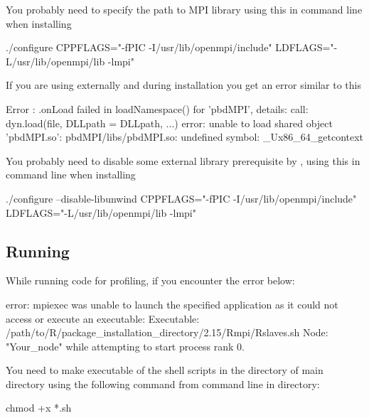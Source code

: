 \begin{solution}
You probably need to specify the path to MPI library
using this in command line when installing 
\begin{Output}
./configure CPPFLAGS="-fPIC -I/usr/lib/openmpi/include" LDFLAGS="-L/usr/lib/openmpi/lib -lmpi"
\end{Output}  
\end{solution}


\begin{problem}
If you are using  externally
and during 
installation you get an error similar to this
\begin{Output}
Error : .onLoad failed in loadNamespace() for 'pbdMPI', details:
  call: dyn.load(file, DLLpath = DLLpath, ...)
  error: unable to load shared object 'pbdMPI.so':
  pbdMPI/libs/pbdMPI.so: undefined symbol: _Ux86_64_getcontext
\end{Output}
\end{problem}
  
\begin{solution}
You probably need to disable some external library
prerequisite by ,
using this in command line when installing 
\begin{Code}
./configure --disable-libunwind CPPFLAGS="-fPIC -I/usr/lib/openmpi/include" LDFLAGS="-L/usr/lib/openmpi/lib -lmpi"
\end{Code}  
\end{solution}


\subsection{Running}

\begin{problem}
While running  code for profiling, if you
encounter the error below:
\begin{Output}
error: mpiexec was unable to launch the specified application as it could not access
or execute an executable:
Executable: /path/to/R/package_installation_directory/2.15/Rmpi/Rslaves.sh
Node: "Your_node"
while attempting to start process rank 0.
\end{Output} 
\end{problem}

\begin{solution}
You need to make executable of the shell scripts in 
the  directory of  main directory using the following command from 
command line in  directory:
\begin{Code}
chmod +x *.sh
\end{Code}  
\end{solution}


